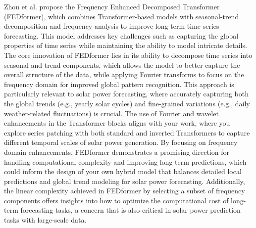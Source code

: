 \documentclass[12pt]{uomthesis}
\begin{document}
Zhou et al. \cite{zhou2022fedformer} propose the Frequency Enhanced Decomposed Transformer (FEDformer), which combines Transformer-based models with seasonal-trend decomposition and frequency analysis to improve long-term time series forecasting. This model addresses key challenges such as capturing the global properties of time series while maintaining the ability to model intricate details. The core innovation of FEDformer lies in its ability to decompose time series into seasonal and trend components, which allows the model to better capture the overall structure of the data, while applying Fourier transforms to focus on the frequency domain for improved global pattern recognition. This approach is particularly relevant to solar power forecasting, where accurately capturing both the global trends (e.g., yearly solar cycles) and fine-grained variations (e.g., daily weather-related fluctuations) is crucial. The use of Fourier and wavelet enhancements in the Transformer blocks aligns with your work, where you explore series patching with both standard and inverted Transformers to capture different temporal scales of solar power generation. By focusing on frequency domain enhancements, FEDformer demonstrates a promising direction for handling computational complexity and improving long-term predictions, which could inform the design of your own hybrid model that balances detailed local predictions and global trend modeling for solar power forecasting. Additionally, the linear complexity achieved in FEDformer by selecting a subset of frequency components offers insights into how to optimize the computational cost of long-term forecasting tasks, a concern that is also critical in solar power prediction tasks with large-scale data.
\end{document}
